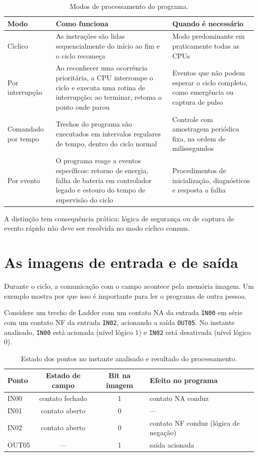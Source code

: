 \begin{table}[H]
  \centering
  \caption{Modos de processamento do programa.}
  \label{tab:modos-processamento}
  \begin{tabular}{p{3.2cm} p{6.2cm} p{5.2cm}}
    \toprule
    Modo & Como funciona & Quando é necessário \\
    \midrule
    Cíclico
      & As instruções são lidas sequencialmente do início ao fim e o ciclo recomeça
      & Modo predominante em praticamente todas as CPUs \\
    Por interrupção
      & Ao reconhecer uma ocorrência prioritária, a CPU interrompe o ciclo e executa uma rotina de
interrupção; ao terminar, retoma o ponto onde parou
      & Eventos que não podem esperar o ciclo completo, como emergência ou captura de pulso \\
    Comandado por tempo
      & Trechos do programa são executados em intervalos regulares de tempo, dentro do ciclo normal
      & Controle com amostragem periódica fixa, na ordem de milissegundos \\
    Por evento
      & O programa reage a eventos específicos: retorno de energia, falha de bateria em controlador
legado e estouro do tempo de supervisão do ciclo
      & Procedimentos de inicialização, diagnósticos e resposta a falha \\
    \bottomrule
  \end{tabular}
\end{table}

A distinção tem consequência prática: lógica de segurança ou de captura de evento rápido não deve ser
resolvida no modo cíclico comum.

\section{As imagens de entrada e de saída}

Durante o ciclo, a comunicação com o campo acontece pela memória imagem. Um exemplo mostra por que
isso é importante para ler o programa de outra pessoa.

Considere um trecho de Ladder com um contato NA da entrada \texttt{IN00} em série com um contato NF da
entrada \texttt{IN02}, acionando a saída \texttt{OUT05}. No instante analisado, \texttt{IN00} está
acionada (nível lógico 1) e \texttt{IN02} está desativada (nível lógico 0).

\begin{table}[H]
  \centering
  \caption{Estado dos pontos no instante analisado e resultado do processamento.}
  \label{tab:imagem-es}
  \begin{tabular}{l c c l}
    \toprule
    Ponto & Estado de campo & Bit na imagem & Efeito no programa \\
    \midrule
    IN00 & contato fechado & 1 & contato NA conduz \\
    IN01 & contato aberto  & 0 & --- \\
    IN02 & contato aberto  & 0 & contato NF conduz (lógica de negação) \\
    \midrule
    OUT05 & --- & 1 & saída acionada \\
    \bottomrule
  \end{tabular}
\end{table}


